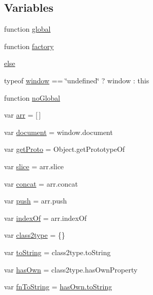 \subsection*{Variables}
\begin{DoxyCompactItemize}
\item 
function \hyperlink{jquery-3_82_81_8js_a57efe929cc6b44042891d05e15cec785}{global}
\item 
function \hyperlink{jquery-3_82_81_8js_abf075bdbe59fd2c3336ed052c9c72b31}{factory}
\item 
\hyperlink{jquery-3_82_81_8js_a0544c3fe466e421738dae463968b70ba}{else}
\item 
typeof \hyperlink{jquery-3_82_81_8js_ad55530ae1e5978df8e721017c1fc8466}{window} == \char`\"{}undefined\char`\"{} ? window \+: this
\item 
function \hyperlink{jquery-3_82_81_8js_a4efa44664a3416a8180ce5fc876f0346}{no\+Global}
\item 
var \hyperlink{jquery-3_82_81_8js_a9219f6f481200e42d75e135845aeeb3b}{arr} = \mbox{[}$\,$\mbox{]}
\item 
var \hyperlink{jquery-3_82_81_8js_af61dbe660d8213297c7fed5b5c99d223}{document} = window.\+document
\item 
var \hyperlink{jquery-3_82_81_8js_a8cfba932e510c58e75654c8bf0c22e8a}{get\+Proto} = Object.\+get\+Prototype\+Of
\item 
var \hyperlink{jquery-3_82_81_8js_acab0c09ac73e7a3c85a21fa773e9b8b0}{slice} = arr.\+slice
\item 
var \hyperlink{jquery-3_82_81_8js_a15269536d89ee10703f1699529a34bdc}{concat} = arr.\+concat
\item 
var \hyperlink{jquery-3_82_81_8js_aa24e781fe0b662d38aac138432ec5e48}{push} = arr.\+push
\item 
var \hyperlink{jquery-3_82_81_8js_a2b42b59c40371ac6f69bdd12a58bdf7d}{index\+Of} = arr.\+index\+Of
\item 
var \hyperlink{jquery-3_82_81_8js_adef4ad1257810e1309dcf8489dcb4cc5}{class2type} = \{\}
\item 
var \hyperlink{jquery-3_82_81_8js_a7c9b2c6889147a97101a5409709b8d91}{to\+String} = class2type.\+to\+String
\item 
var \hyperlink{jquery-3_82_81_8js_a0511343fcdbac93090154dce865cbfd5}{has\+Own} = class2type.\+has\+Own\+Property
\item 
var \hyperlink{jquery-3_82_81_8js_a0892590a482dae7c20ce31d5934035cd}{fn\+To\+String} = \hyperlink{jquery-3_82_81_8js_a7c9b2c6889147a97101a5409709b8d91}{has\+Own.\+to\+String}

\end{DoxyCompactItemize}
